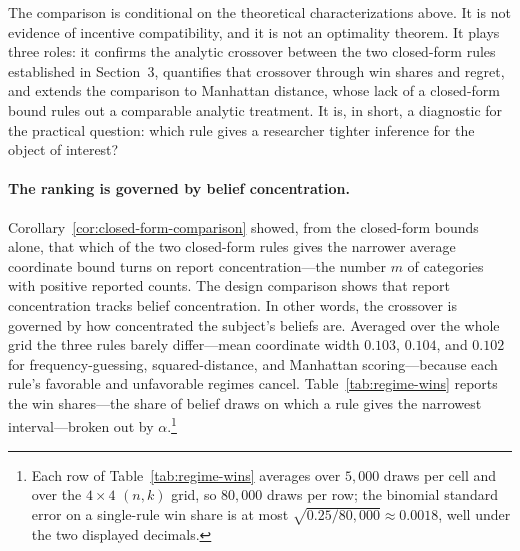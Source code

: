 The comparison is conditional on the theoretical characterizations above.
It is not evidence of incentive compatibility, and it is not an optimality theorem.
It plays three roles: it confirms the analytic crossover between the two closed-form rules established in Section~3, quantifies that crossover through win shares and regret, and extends the comparison to Manhattan distance, whose lack of a closed-form bound rules out a comparable analytic treatment.
It is, in short, a diagnostic for the practical question: which rule gives a researcher tighter inference for the object of interest?

\paragraph{The ranking is governed by belief concentration.}
Corollary~\ref{cor:closed-form-comparison} showed, from the closed-form bounds alone, that which of the two closed-form rules gives the narrower average coordinate bound turns on report concentration---the number \(m\) of categories with positive reported counts.
The design comparison shows that report concentration tracks belief concentration.
In other words, the crossover is governed by how concentrated the subject's beliefs are.
Averaged over the whole grid the three rules barely differ---mean coordinate width \(0.103\), \(0.104\), and \(0.102\) for frequency-guessing, squared-distance, and Manhattan scoring---because each rule's favorable and unfavorable regimes cancel.
Table~\ref{tab:regime-wins} reports the win shares---the share of belief draws on which a rule gives the narrowest interval---broken out by \(\alpha\).\footnote{Each row of Table~\ref{tab:regime-wins} averages over \(5{,}000\) draws per cell and over the \(4\times 4\) \((n,k)\) grid, so \(80{,}000\) draws per row; the binomial standard error on a single-rule win share is at most \(\sqrt{0.25/80{,}000}\approx 0.0018\), well under the two displayed decimals.}

